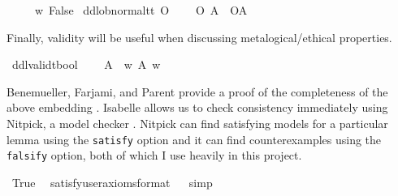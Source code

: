 \begin{isabellebody}
\ \ \ {\isachardoublequoteopen}\isactrlbold {\isasymbottom}\ {\isasymequiv}\ {\isasymlambda}w{\isachardot}\ False{\isachardoublequoteclose}\isanewline
{}\isamarkupfalse%
\ ddlob{\isacharunderscore}normal{\isacharcolon}{\isacharcolon}{\isachardoublequoteopen}t{\isasymRightarrow}t{\isachardoublequoteclose}\ {\isacharparenleft}{\isachardoublequoteopen}O\ {\isacharbraceleft}{\isacharunderscore}{\isacharbraceright}{\isachardoublequoteclose}{\isacharparenright}\isanewline
\ \ \ {\isachardoublequoteopen}{\isacharparenleft}O\ {\isacharbraceleft}A{\isacharbraceright}{\isacharparenright}\ {\isasymequiv}\ {\isacharparenleft}O{\isacharbraceleft}A{\isacharbar}\isactrlbold {\isasymtop}{\isacharbraceright}{\isacharparenright}\ {\isachardoublequoteclose}\isanewline
%
%
\begin{isamarkuptext}%
\noindent Finally, validity will be useful when discussing metalogical/ethical properties.%
\end{isamarkuptext}\isamarkuptrue%
\isamarkupfalse%
\ ddlvalid{\isacharcolon}{\isacharcolon}{\isachardoublequoteopen}t{\isasymRightarrow}bool{\isachardoublequoteclose}\ {\isacharparenleft}{\isachardoublequoteopen}{\isasymTurnstile}{\isacharunderscore}{\isachardoublequoteclose}{\isacharparenright}\isanewline
\ \ \ {\isachardoublequoteopen}{\isasymTurnstile}A\ {\isasymequiv}\ {\isasymforall}w{\isachardot}\ A\ w{\isachardoublequoteclose}\isanewline
%
%
\begin{isamarkuptext}%
Benemueller, Farjami, and Parent provide a proof of the completeness of the above embedding \citep{BFP}.
Isabelle allows us to check consistency immediately using Nitpick, a model checker \citep{nitpick}.
Nitpick can find satisfying models for a particular lemma using the \texttt{satisfy} option and it can 
find counterexamples using the \texttt{falsify} option, both of which I use heavily in this project.%
\end{isamarkuptext}\isamarkuptrue%
\isamarkupfalse%
\ True\ \isamarkupfalse%
\ {\isacharbrackleft}satisfy{\isacharcomma}user{\isacharunderscore}axioms{\isacharcomma}format{\isacharequal}{}{\isacharbrackright}%
\isadelimproof
\ %
\endisadelimproof
%
\isatagproof
{}\isamarkupfalse%
\ simp\isanewline
%
\isanewline
%
\end{isabellebody}

